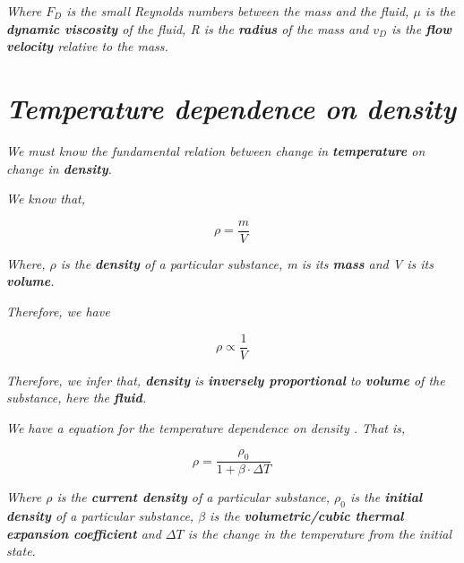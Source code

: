     \textit{Where $F_D$ is the small Reynolds numbers between the mass and the fluid, $\mu$ is the \textbf{dynamic viscosity} of the fluid, R is the \textbf{radius} of the mass and $v_D$ is the \textbf{flow velocity} relative to the mass.}

\section{\textit{Temperature dependence on density}}
            
	\textit{We must know the fundamental relation between change in \textbf{temperature} on change in \textbf{density}.}
            
    \textit{We know that,}
    
    		$$\rho = \frac{m}{V}$$
            
	\textit{Where, $\rho$ is the \textbf{density} of a particular substance, m is its \textbf{mass} and V is its \textbf{volume}.}            
          
	\textit{Therefore, we have}          
            
		$$\rho \propto \frac{1}{V}$$            
            
	\textit{Therefore, we infer that, \textbf{density} is \textbf{inversely proportional} to \textbf{volume} of the substance, here the \textbf{fluid}.}            
            
	\textit{We have a equation for the temperature dependence on density \cite{0}. That is,}            
            
		$$\rho = \frac{\rho_{0}}{1 + \beta\cdot\Delta T}$$            

	\textit{Where $\rho$ is the \textbf{current density} of a particular substance, $\rho_{0}$ is the \textbf{initial density} of a particular substance, $\beta$ is the \textbf{volumetric/cubic thermal expansion coefficient} and $\Delta T$ is the change in the temperature from the initial state.}            
            
            
            
            
